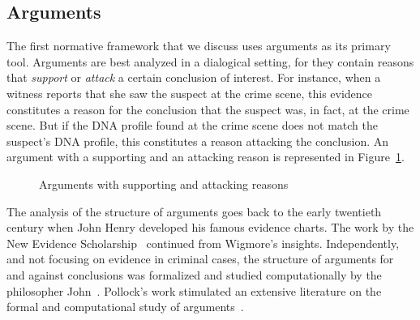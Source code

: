 \documentclass[10pt]{article}
\begin{document}

\subsection{Arguments}

The first normative framework %
that we discuss uses arguments as its primary tool. 
Arguments are best analyzed in a dialogical setting, for they 
contain reasons that \textit{support} or \textit{attack} a certain conclusion of interest. For instance, when a witness reports that 
she saw the suspect at the crime scene, this evidence constitutes a reason for the conclusion that 
the suspect was, in fact, at the crime scene. But if the DNA profile found at the crime scene 
does not match the suspect's DNA profile, this constitutes 
a reason attacking the conclusion. An argument with a supporting and 
an attacking reason is represented in Figure~\ref{fig:arg}.

\begin{figure}[bt]
\centering

\caption{Arguments with supporting and attacking reasons\label{fig:arg}}
\end{figure}


The analysis of the structure of arguments goes back to the early twentieth century when John Henry \citet{wigmore1913} developed his famous evidence charts. The work by the New Evidence Scholarship~\citep{andersonEtal2005} continued from Wigmore's insights. Independently, and not focusing on evidence in criminal cases, the structure of arguments for and against conclusions was formalized and studied  computationally by the philosopher John~\citet{pollock1987,pollock1995}. Pollock's work stimulated an extensive literature on the formal and computational study of arguments~\citep{vanEemerenEtal2014ch11}.
\end{document}
